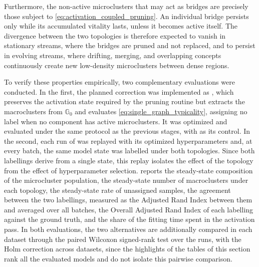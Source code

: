 Furthermore, the non-active microclusters that may act as bridges are precisely those subject to \cref{eq:activation_coupled_pruning}. An individual bridge persists only while its accumulated vitality lasts, unless it becomes active itself. The divergence between the two topologies is therefore expected to vanish in stationary streams, where the bridges are pruned and not replaced, and to persist in evolving streams, where drifting, merging, and overlapping concepts continuously create new low-density microclusters between dense regions.

To verify these properties empirically, two complementary evaluations were conducted. In the first, the planned correction was implemented as , which preserves the activation state required by the pruning routine but extracts the macroclusters from $\mathbb{G}_0$ and evaluates \cref{eq:single_graph_typicality}, assigning no label when no component has active microclusters. It was optimized and evaluated under the same protocol as the previous stages, with  as its control. In the second, each run of  was replayed with its optimized hyperparameters and, at every batch, the same model state was labelled under both topologies. Since both labellings derive from a single state, this replay isolates the effect of the topology from the effect of hyperparameter selection.  reports the steady-state composition of the microcluster population, the steady-state number of macroclusters under each topology, the steady-state rate of unassigned samples, the agreement between the two labellings, measured as the Adjusted Rand Index between them and averaged over all batches, the Overall Adjusted Rand Index of each labelling against the ground truth, and the share of the fitting time spent in the activation pass. In both evaluations, the two alternatives are additionally compared in each dataset through the paired Wilcoxon signed-rank test over the runs, with the Holm correction across datasets, since the highlights of the tables of this section rank all the evaluated models and do not isolate this pairwise comparison.



